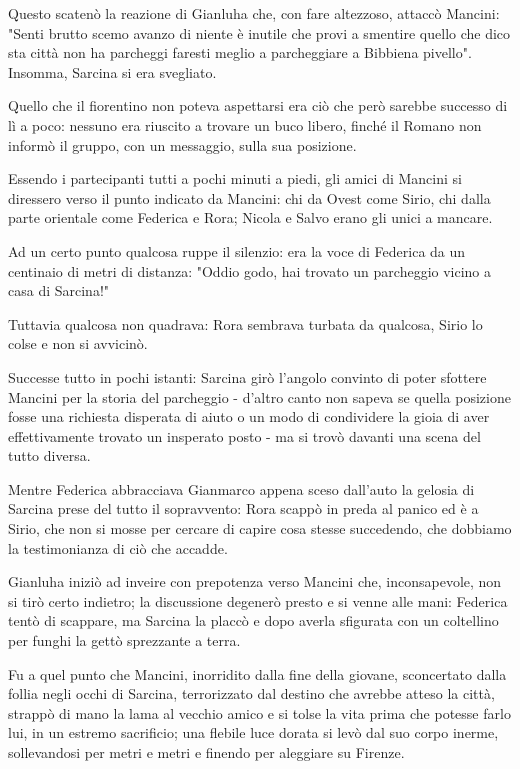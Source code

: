 Questo scatenò la reazione di Gianluha che, con fare altezzoso, attaccò Mancini: "Senti brutto scemo avanzo di niente è inutile che provi a smentire quello che dico sta città non ha parcheggi faresti meglio a parcheggiare a Bibbiena pivello". Insomma, Sarcina si era svegliato.

Quello che il fiorentino non poteva aspettarsi era ciò che però sarebbe successo di lì a poco: nessuno era riuscito a trovare un buco libero, finché il Romano non informò il gruppo, con un messaggio, sulla sua posizione. 

Essendo i partecipanti tutti a pochi minuti a piedi, gli amici di Mancini si diressero verso il punto indicato da Mancini: chi da Ovest come Sirio, chi dalla parte orientale come Federica e Rora; Nicola e Salvo erano gli unici a mancare.

Ad un certo punto qualcosa ruppe il silenzio: era la voce di Federica da un centinaio di metri di distanza: "Oddio godo, hai trovato un parcheggio vicino a casa di Sarcina!"

Tuttavia qualcosa non quadrava: Rora sembrava turbata da qualcosa, Sirio lo colse e non si avvicinò. 

Successe tutto in pochi istanti: Sarcina girò l'angolo convinto di poter sfottere Mancini per la storia del parcheggio - d'altro canto non sapeva se quella posizione fosse una richiesta disperata di aiuto o un modo di condividere la gioia di aver effettivamente trovato un insperato posto - ma si trovò davanti una scena del tutto diversa.

Mentre Federica abbracciava Gianmarco appena sceso dall'auto la gelosia di Sarcina prese del tutto il sopravvento: Rora scappò in preda al panico ed è a Sirio, che non si mosse per cercare di capire cosa stesse succedendo, che dobbiamo la testimonianza di ciò che accadde.

Gianluha iniziò ad inveire con prepotenza verso Mancini che, inconsapevole, non si tirò certo indietro; la discussione degenerò presto e si venne alle mani: Federica tentò di scappare, ma Sarcina la placcò e dopo averla sfigurata con un coltellino per funghi la gettò sprezzante a terra.

Fu a quel punto che Mancini, inorridito dalla fine della giovane, sconcertato dalla follia negli occhi di Sarcina, terrorizzato dal destino che avrebbe atteso la città, strappò di mano la lama al vecchio amico e si tolse la vita prima che potesse farlo lui, in un estremo sacrificio; una flebile luce dorata si levò dal suo corpo inerme, sollevandosi per metri e metri e finendo per aleggiare su Firenze.

